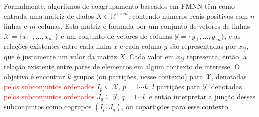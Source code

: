 \documentclass[
    12pt,                %
    oneside,            %
    a4paper,            %
    english,            %
    brazil                %
    ]{abntex2ppgsi}
\begin{document}
Formalmente, algoritmos de coagrupamento baseados em FMNN têm como entrada uma matriz de dados $X \in \mathbb{R}^{n \times m}_{+}$, contendo números reais positivos com $n$ linhas e $m$ colunas. Esta matriz é formada por um conjunto de vetores de linhas $\mathcal{X} = \{ x_{1 \cdot}, \dots, x_{n \cdot} \}$ e um conjunto de vetores de colunas ${\mathcal{Y}} = \{ y_{\cdot 1}, \dots, y_{\cdot m} \}$, e as relações existentes entre cada linha $x$ e cada coluna $y$ são representadas por $x_{ij}$, que é justamente um valor da matriz $X$. Cada valor em $x_{ij}$ representa, então, a relação existente entre pares de elementos em algum contexto de interesse. O objetivo é encontrar $k$ grupos (ou partições, nesse contexto) para $\mathcal{X}$, denotadas \textcolor{red}{pelos subconjuntos ordenados} $I_p \subseteq \mathcal{X}$, $p = 1 \cdots k$, $l$ partições para $\mathcal{Y}$, denotadas \textcolor{red}{pelos subconjuntos ordenados} $J_q \subseteq \mathcal{Y}$, $q = 1 \cdots l$, e então interpretar a junção desses subconjuntos como cogrupos $(I_p, J_q)$, ou copartições para esse contexto.




\end{document}
